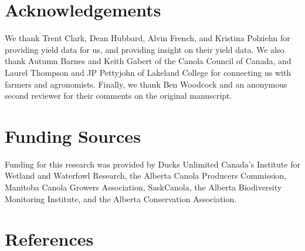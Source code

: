 \documentclass[]{elsarticle} %
\begin{document}
\hypertarget{acknowledgements}{%
\section{Acknowledgements}\label{acknowledgements}}

We thank Trent Clark, Dean Hubbard, Alvin French, and Kristina Polziehn for providing yield data for us, and providing insight on their yield data.
We also thank Autumn Barnes and Keith Gabert of the Canola Council of Canada, and Laurel Thompson and JP Pettyjohn of Lakeland College for connecting us with farmers and agronomists.
Finally, we thank Ben Woodcock and an anonymous second reviewer for their comments on the original manuscript.

\hypertarget{funding-sources}{%
\section{Funding Sources}\label{funding-sources}}

Funding for this research was provided by Ducks Unlimited Canada's Institute for Wetland and Waterfowl Research, the Alberta Canola Producers Commission, Manitoba Canola Growers Association, SaskCanola, the Alberta Biodiversity Monitoring Institute, and the Alberta Conservation Association.

\hypertarget{references}{%
\section*{References}\label{references}}
\end{document}
